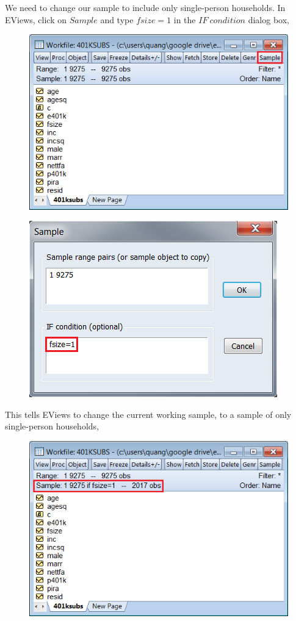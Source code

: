 \documentclass[12pt]{report}
\begin{document}
\noindent We need to change our sample to include only single-person households. In EViews,
click on $Sample$ and type $fsize=1$ in the $IF\ condition$ dialog box,
\begin{figure}[H]
	\centering
	\includegraphics{tute6_q3_1}
\end{figure}
\vspace{-\baselineskip}
\begin{figure}[H]
	\centering
	\includegraphics{tute6_q3_2}
\end{figure}
\vspace{-\baselineskip}
\noindent This tells EViews to change the current working sample, to a sample of only single-person households,
\begin{figure}[H]
	\centering
	\includegraphics{tute6_q3_3}
\end{figure}
\end{document}
